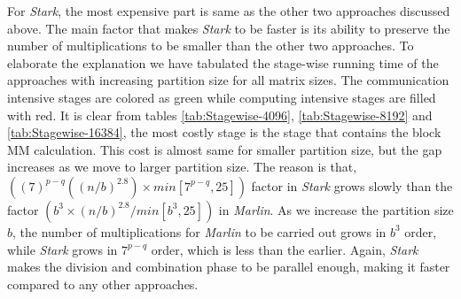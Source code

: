 For \textit{Stark}, the most expensive part is same as the other two approaches discussed above. The main factor that makes \textit{Stark} to be faster is its ability to preserve the number of multiplications to be smaller than the other two approaches. To elaborate the explanation we have tabulated the stage-wise running time of the approaches with increasing partition size for all matrix sizes. The communication intensive stages are colored as green while computing intensive stages are filled with red. It is clear from tables \ref{tab:Stagewise-4096}, \ref{tab:Stagewise-8192} and \ref{tab:Stagewise-16384}, the most costly stage is the stage that contains the block MM calculation. This cost is almost same for smaller partition size, but the gap increases as we move to larger partition size. The reason is that, $((7)^{p-q}((n/b)^{2.8})\times min[7^{p-q},25])$ factor in \textit{Stark} grows slowly than the factor $(b^{3}\times (n/b)^{2.8}/min[b^{3},25])$ in \textit{Marlin}. As we increase the partition size $b$, the number of multiplications for \textit{Marlin} to be carried out grows in $b^{3}$ order, while \textit{Stark} grows in $7^{p-q}$ order, which is less than the earlier. Again, \textit{Stark} makes the division and combination phase to be parallel enough, making it faster compared to any other approaches.

